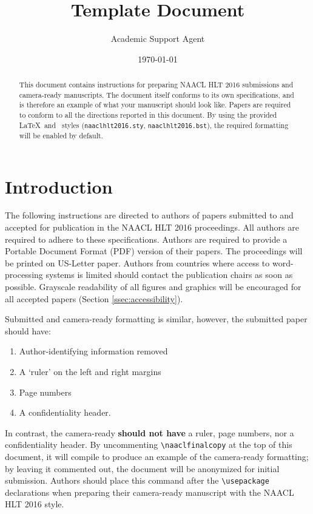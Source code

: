 \documentclass{article}
\title{Template Document}
\author{Academic Support Agent}
\date{\today}
\begin{document}
\maketitle

\maketitle

\begin{abstract}
 This document contains instructions for preparing NAACL HLT 2016 submissions and camera-ready
  manuscripts.  The document itself conforms
  to its own specifications, and is therefore an example of what
  your manuscript should look like.  Papers are required to conform to
  all the directions reported in this document.  
By using the provided \LaTeX\ and \BibTeX\ styles ({\small\tt naaclhlt2016.sty}, {\small\tt naaclhlt2016.bst}), the required formatting will be enabled by default.
\end{abstract}

\section{Introduction}

The following instructions are directed to authors of papers submitted to and accepted
for publication in the NAACL HLT 2016 proceedings.  All authors are required
to adhere to these specifications. Authors are required to provide 
a Portable Document Format (PDF) version of
their papers.  The proceedings will be printed on US-Letter paper.
Authors from countries where access to word-processing systems is
limited should contact the publication chairs as soon as possible.
 Grayscale readability of all figures and
graphics will be encouraged for all accepted papers
(Section \ref{ssec:accessibility}).  

Submitted and camera-ready formatting is similar,
  however, the submitted paper should have:
\begin{enumerate} 
\item Author-identifying information removed
\item A `ruler' on the left and right margins
\item Page numbers 
\item A confidentiality header.  
\end{enumerate}
In contrast, the camera-ready {\bf should  not have} a ruler, page numbers, nor a confidentiality header.  By uncommenting {\small\verb|\naaclfinalcopy|} at the top of this 
 document, it will compile to produce an example of the camera-ready formatting; by leaving it commented out, the document will be anonymized for initial submission.  Authors should place this command after the {\small\verb|\usepackage|} declarations when preparing their camera-ready manuscript with the NAACL HLT 2016 style.
\end{document}
